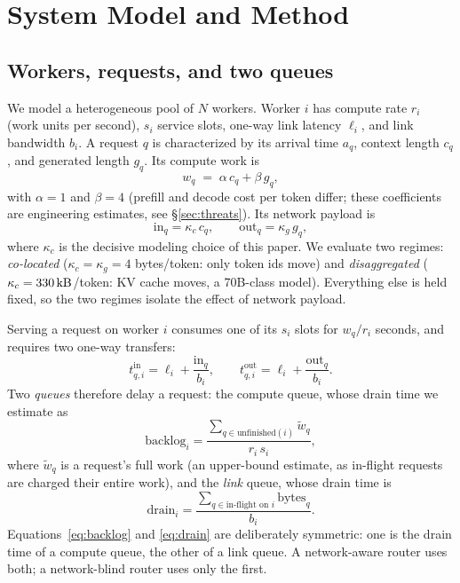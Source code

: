 \section{System Model and Method}
\label{sec:model}

\subsection{Workers, requests, and two queues}
We model a heterogeneous pool of $N$ workers. Worker $i$ has compute rate $r_i$ (work units per
second), $s_i$ service slots, one-way link latency $\ell_i$, and link bandwidth $b_i$. A request
$q$ is characterized by its arrival time $a_q$, context length $c_q$, and generated length $g_q$.
Its compute work is
\begin{equation}
  w_q \;=\; \alpha\, c_q + \beta\, g_q ,
  \label{eq:work}
\end{equation}
with $\alpha=1$ and $\beta=4$ (prefill and decode cost per token differ; these coefficients are
engineering estimates, see \S\ref{sec:threats}). Its network payload is
\begin{equation}
  \text{in}_q = \kappa_c\, c_q, \qquad \text{out}_q = \kappa_g\, g_q ,
  \label{eq:bytes}
\end{equation}
where $\kappa_c$ is the decisive modeling choice of this paper. We evaluate two regimes:
\emph{co-located} ($\kappa_c=\kappa_g=4$ bytes/token: only token ids move) and
\emph{disaggregated} ($\kappa_c=\SI{330}{\kilo\byte}$/token: KV cache moves, a 70B-class model).
Everything else is held fixed, so the two regimes isolate the effect of network payload.

Serving a request on worker $i$ consumes one of its $s_i$ slots for $w_q/r_i$ seconds, and
requires two one-way transfers:
\begin{equation}
  t^{\text{in}}_{q,i} = \ell_i + \frac{\text{in}_q}{b_i}, \qquad
  t^{\text{out}}_{q,i} = \ell_i + \frac{\text{out}_q}{b_i}.
  \label{eq:net}
\end{equation}
Two \emph{queues} therefore delay a request: the compute queue, whose drain time we estimate as
\begin{equation}
  \text{backlog}_i = \frac{\sum_{q \in \text{unfinished}(i)} \tilde w_q}{r_i\, s_i},
  \label{eq:backlog}
\end{equation}
where $\tilde w_q$ is a request's full work (an upper-bound estimate, as in-flight requests are
charged their entire work), and the \emph{link} queue, whose drain time is
\begin{equation}
  \text{drain}_i = \frac{\sum_{q \in \text{in-flight on } i} \text{bytes}_q}{b_i}.
  \label{eq:drain}
\end{equation}
Equations~\eqref{eq:backlog} and \eqref{eq:drain} are deliberately symmetric: one is the drain
time of a compute queue, the other of a link queue. A network-aware router uses both; a
network-blind router uses only the first.

